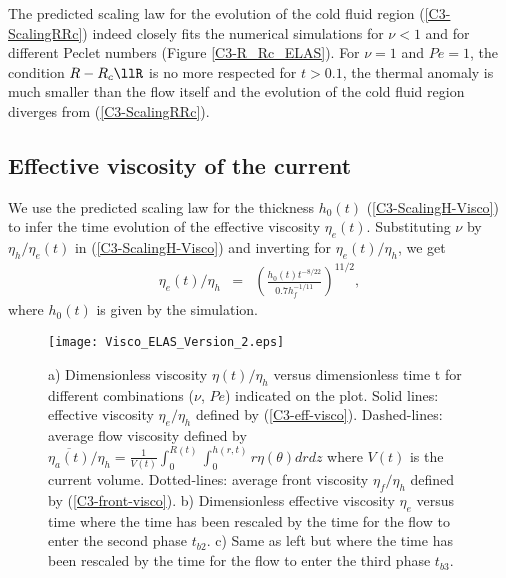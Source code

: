 The predicted scaling  law for the evolution of the  cold fluid region
(\ref{C3-ScalingRRc})  indeed closely  fits the  numerical simulations
for    $\nu<1$   and    for   different    Peclet   numbers    (Figure
\ref{C3-R_Rc_ELAS}). For $\nu=1$ and  $Pe=1$, the condition $R-R_c\llR$
is no more respected for $t>0.1$,  the thermal anomaly is much smaller
than  the flow  itself  and the  evolution of  the  cold fluid  region
diverges from (\ref{C3-ScalingRRc}).

\subsection{Effective viscosity of the current}
\label{C3-sec:effect-visc-blist-e}

We  use  the   predicted  scaling  law  for   the  thickness  $h_0(t)$
(\ref{C3-ScalingH-Visco}) to infer the time evolution of the effective
viscosity  $\eta_e(t)$. Substituting  $\nu$  by $\eta_h/\eta_e(t)$  in
(\ref{C3-ScalingH-Visco}) and inverting for $\eta_e(t)/\eta_h$, we get
\begin{eqnarray}
  \eta_e(t)/\eta_h&=& \left(\frac{h_0(t)t^{-8/22}}{0.7 h_f^{-1/11}}\right)^{11/2}\label{C3-eff-visco},
\end{eqnarray}
where $h_0(t)$ is given by the simulation.
\begin{figure}[h!]
  \begin{center}
    \graphicspath{ {/Users/thorey/Documents/These/Projet/Refroidissement/Skin_Model/Figure/JFM_V13/} }
    \texttt{[image: Visco\_ELAS\_Version\_2.eps]}
    \caption{a)   Dimensionless   viscosity  $\eta(t)/\eta_h$   versus
      dimensionless time  t for  different combinations  ($\nu$, $Pe$)
      indicated  on  the  plot.    Solid  lines:  effective  viscosity
      $\eta_e/\eta_h$ defined  by (\ref{C3-eff-visco}).  Dashed-lines:
      average         flow         viscosity        defined         by
      $\overline{\eta_a(t)}/\eta_h                                   =
      \frac{1}{V(t)}\int_0^{R(t)}\int_0^{h(r,t)} r \eta(\theta) dr dz$
      where $V(t)$ is the current volume.  Dotted-lines: average front
      viscosity $\eta_f/\eta_h$ defined by (\ref{C3-front-visco}).  b)
      Dimensionless effective viscosity $\eta_e$ versus time where the
      time has  been rescaled by  the time for  the flow to  enter the
      second phase  $t_{b2}$. c) Same as  left but where the  time has
      been rescaled by the time for  the flow to enter the third phase
      $t_{b3}$.  }
    \label{C3-Visco_ELAS_Version_2}
  \end{center}
\end{figure}

